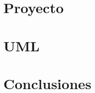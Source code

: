 \documentclass[11pt,fleqn]{book} %
\begin{document}
\part{Proyecto}


\part{UML}









\part{Conclusiones}






\printbibliography
\end{document}
